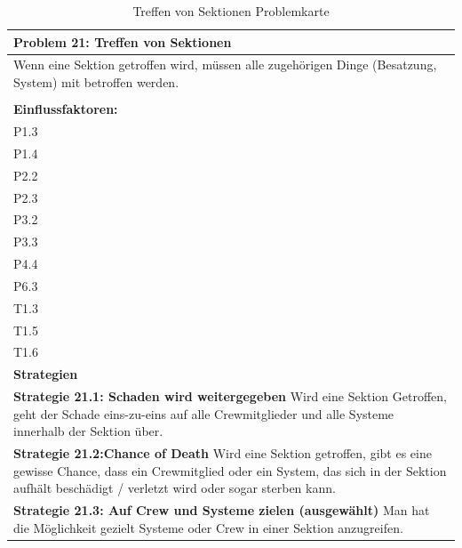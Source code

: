 \documentclass[fontsize=12pt,paper=a4,twoside]{scrartcl}
\begin{document}
\begin{table}[H]
    \centering
    \begin{tabular}{|p{15cm}|}
    \hline
          \textbf{Problem 21: Treffen von Sektionen}  \\ \hline
	Wenn eine Sektion getroffen wird, müssen alle zugehörigen Dinge (Besatzung, System) mit betroffen werden. \\
         \\ \hline
          \textbf{Einflussfaktoren: } \\
	P1.3\\
	P1.4 \\
	P2.2 \\
	P2.3 \\
	P3.2 \\
	P3.3 \\
	P4.4 \\
	P6.3 \\
	T1.3 \\
	T1.5 \\
	T1.6 \\
          \hline
          \textbf{Strategien} \\ \hline
            {}          
           \label{strategie:21.1}     
          \textbf{Strategie 21.1: Schaden wird weitergegeben} Wird eine Sektion Getroffen, geht der Schade eins-zu-eins auf alle Crewmitglieder und alle Systeme innerhalb der Sektion über.  \\        
  {}          
           \label{strategie:21.2}              
          \textbf{Strategie 21.2:Chance of Death} Wird eine Sektion getroffen, gibt es eine gewisse Chance, dass ein Crewmitglied oder ein System, das sich in der Sektion aufhält beschädigt / verletzt wird oder sogar sterben kann.  \\
	 {}
	 \label{strategie:21.3}
	 \textbf{Strategie 21.3: Auf Crew und Systeme zielen (ausgewählt)} Man hat die Möglichkeit gezielt Systeme oder Crew in einer Sektion anzugreifen.
	 	 \\ \hline
    \end{tabular}
    

    \caption{Treffen von Sektionen Problemkarte}
    \label{tab:ProblemKarte21}
\end{table}
\end{document}
